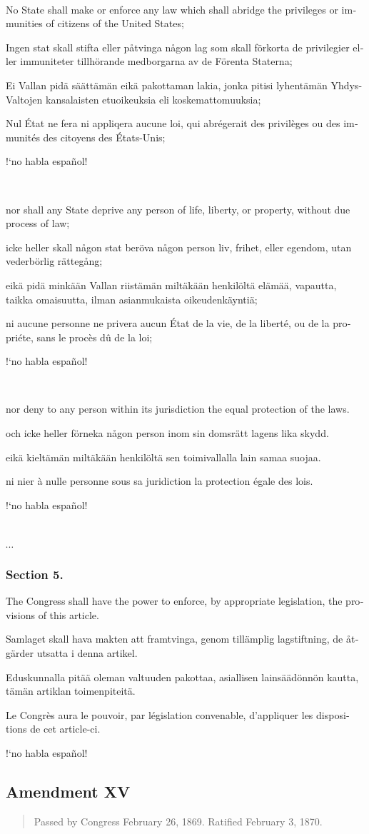 \documentclass[a4paper,landscape,10pt]{article}
\newcommand{\tblock}[5]{\noindent\begin{minipage}[t]{0.18\textwidth}\foreignlanguage{english}{#1}\end{minipage}\hskip 0.025\textwidth\begin{minipage}[t]{0.18\textwidth}\foreignlanguage{swedish}{#2}\end{minipage}\hskip 0.025\textwidth\begin{minipage}[t]{0.18\textwidth}\foreignlanguage{finnish}{#3}\end{minipage}\hskip 0.025\textwidth\begin{minipage}[t]{0.18\textwidth}\foreignlanguage{french}{#4}\end{minipage}\hskip 0.025\textwidth\begin{minipage}[t]{0.18\textwidth}\foreignlanguage{spanish}{#5}\end{minipage}}
\begin{document}
~

\tblock
{No State shall make or enforce any law which shall abridge the privileges or immunities of citizens of the United States;}
{Ingen stat skall stifta eller påtvinga någon lag som skall förkorta de privilegier eller immuniteter tillhörande medborgarna av de Förenta Staterna;}
{Ei Vallan pidä säättämän eikä pakottaman lakia, jonka pitisi lyhentämän Yhdys-Valtojen kansalaisten etuoikeuksia eli koskemattomuuksia;}
{Nul État ne fera ni appliqera aucune loi, qui abrégerait des privilèges ou des immunités des citoyens des États-Unis;}
{!`no habla español!}

~

\tblock
{nor shall any State deprive any person of life, liberty, or property, without due process of law;}
{icke heller skall någon stat beröva någon person liv, frihet, eller egendom, utan vederbörlig rättegång;}
{eikä pidä minkään Vallan riistämän miltäkään henkilöltä elämää, vapautta, taikka omaisuutta, ilman asianmukaista oikeudenkäyntiä;}
{ni aucune personne ne privera aucun État de la vie, de la liberté, ou de la propriéte, sans le procès dû de la loi;}
{!`no habla español!}

	
~

\tblock
{nor deny to any person within its jurisdiction the equal protection of the laws.}
{och icke heller förneka någon person inom sin domsrätt lagens lika skydd.}
{eikä kieltämän miltäkään henkilöltä sen toimivallalla lain samaa suojaa.}
{ni nier à nulle personne sous sa juridiction la protection égale des lois.}
{!`no habla español!}

~
		
$\cdots$

\subsubsection*{Section 5.}
\tblock
{The Congress shall have the power to enforce, by appropriate legislation, the provisions of this article.}
{Samlaget skall hava makten att framtvinga, genom tillämplig lagstiftning, de åtgärder utsatta i denna artikel.}
{Eduskunnalla pitää oleman valtuuden pakottaa, asiallisen lainsäädönnön kautta, tämän artiklan toimenpiteitä.}
{Le Congrès aura le pouvoir, par législation convenable, d'appliquer les dispositions de cet article-ci.}
{!`no habla español!}


\subsection*{Amendment XV}
\begin{quote}\small
	Passed by Congress February 26, 1869. Ratified February 3, 1870.
\end{quote}
\end{document}
